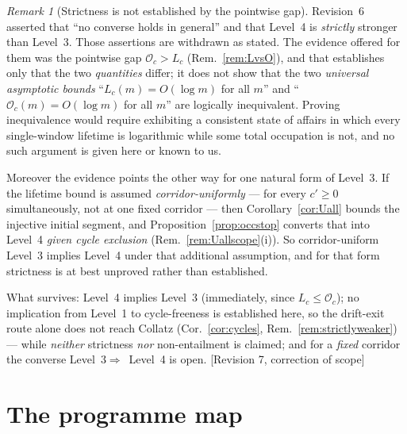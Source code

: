 \documentclass[11pt]{article}
\theoremstyle{plain}
\theoremstyle{definition}
\theoremstyle{remark}
\newtheorem{remark}[theorem]{Remark}
\newcommand{\Occ}{\mathcal{O}}
\newcommand{\status}[1]{\textsf{\footnotesize[#1]}}
\begin{document}
\begin{remark}[Strictness is not established by the pointwise gap]\label{rem:strictness}
Revision~6 asserted that ``no converse holds in general'' and that Level~4 is \emph{strictly}
stronger than Level~3. Those assertions are withdrawn as stated. The evidence offered for them was
the pointwise gap $\Occ_c>L_c$ (Rem.~\ref{rem:LvsO}), and that establishes only that the two
\emph{quantities} differ; it does not show that the two \emph{universal asymptotic bounds}
``$L_c(m)=O(\log m)$ for all $m$'' and ``$\Occ_c(m)=O(\log m)$ for all $m$'' are logically
inequivalent. Proving inequivalence would require exhibiting a consistent state of affairs in which
every single-window lifetime is logarithmic while some total occupation is not, and no such
argument is given here or known to us.

Moreover the evidence points the other way for one natural form of Level~3. If the lifetime bound
is assumed \emph{corridor-uniformly} --- for every $c'\ge0$ simultaneously, not at one fixed
corridor --- then Corollary~\ref{cor:Uall} bounds the injective initial segment, and
Proposition~\ref{prop:occstop} converts that into Level~4 \emph{given cycle exclusion}
(Rem.~\ref{rem:Uallscope}(i)). So corridor-uniform Level~3 implies Level~4 under that additional
assumption, and for that form strictness is at best unproved rather than established.

What survives: Level~4 implies Level~3 (immediately, since $L_c\le\Occ_c$); no implication from
Level~1 to cycle-freeness is established here, so the drift-exit route alone does not reach Collatz
(Cor.~\ref{cor:cycles}, Rem.~\ref{rem:strictlyweaker}) --- while \emph{neither} strictness
\emph{nor} non-entailment is claimed; and for a \emph{fixed} corridor the converse
Level~$3\Rightarrow$~Level~4 is open. \status{Revision 7, correction of scope}
\end{remark}

\section{The programme map}\label{sec:map}
\end{document}
